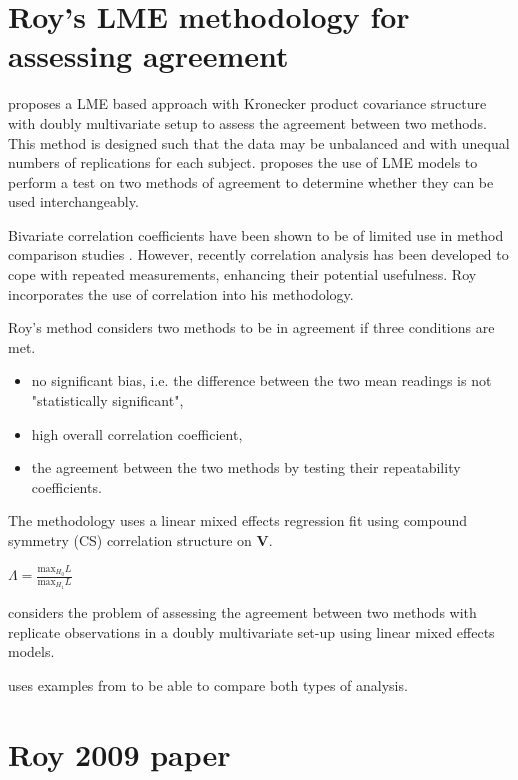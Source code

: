 \documentclass[12pt, a4paper]{report}
\theoremstyle{plain}
\theoremstyle{definition}
\theoremstyle{remark}
\begin{document}
		\section{Roy's LME methodology for assessing agreement}
		
		\citet{ARoy2009} proposes a LME based approach with Kronecker
		product covariance structure with doubly multivariate setup to
		assess the agreement between two methods. This method is designed
		such that the data may be unbalanced and with unequal numbers of
		replications for each subject.	\citet{ARoy2009} proposes the use of LME models to perform a test on two methods of agreement to determine whether they can be used 	interchangeably.
		
		Bivariate correlation coefficients have been shown to be of limited use in method comparison studies \citep{BA86}. However,	recently correlation analysis has been developed to cope with
		repeated measurements, enhancing their potential usefulness. Roy
		incorporates the use of correlation into his methodology.
		
		Roy's method considers two methods to be in agreement if three
		conditions are met.
		
		\begin{itemize}
			\item no significant bias, i.e. the difference between the two
			mean readings is not "statistically significant",
			
			\item high overall correlation coefficient,
			
			\item the agreement between the two methods by testing their
			repeatability coefficients.
			
		\end{itemize}
		
		The methodology uses a linear mixed effects regression fit using
		compound symmetry (CS) correlation structure on \textbf{V}.
		
		
		$\Lambda = \frac{\mbox{max}_{H_{0}}L}{\mbox{max}_{H_{1}}L}$
		

	\citet{ARoy2009} considers the problem of assessing the agreement
	between two methods with replicate observations in a doubly
	multivariate set-up using linear mixed effects models.
	
	\citet{ARoy2009} uses examples from \citet{BA86} to be able to
	compare both types of analysis.
	

\section{Roy 2009 paper}
\end{document}
